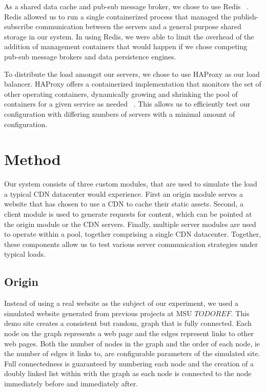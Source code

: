 \documentclass[conference]{IEEEtran}
\begin{document}
As a shared data cache and pub-sub message broker, we chose to use Redis ~\cite{redis}.  Redis allowed us to run a single containerized process that managed the publish-subscribe communication between the servers and a general purpose shared storage in our system. In using Redis, we were able to limit the overhead of the addition of management containers that would happen if we chose competing pub-sub message brokers and data persistence engines.

To distribute the load amongst our servers, we chose to use HAProxy as our load balancer.  HAProxy offers a containerized implementation that monitors the set of other operating containers, dynamically growing and shrinking the pool of containers for a given service as needed ~\cite{haproxy}.  This allows us to efficiently test our configuration with differing numbers of servers with a minimal amount of configuration.

\section{Method}\label{sec:method}
Our system consists of three custom modules, that are used to simulate the load a typical CDN datacenter would experience.  First an origin module serves a website that has chosen to use a CDN to cache their static assets.  Second, a client module is used to generate requests for content, which can be pointed at the origin module or the CDN servers.  Finally, multiple server modules are used to operate within a pool, together comprising a single CDN datacenter.  Together, these components allow us to test various server communication strategies under typical loads.
\subsection*{Origin}

Instead of using a real website as the subject of our experiment, we used a simulated website generated from previous projects at MSU $TODO REF$.  This demo site creates a consistent but random, graph that is fully connected.  Each node on the graph represents a web page and the edges represent links to other web pages.  Both the number of nodes in the graph and the order of each node, ie the number of edges it links to, are configurable parameters of the simulated site.  Full connectedness is guaranteed by numbering each node and the creation of a doubly linked list within with the graph as each node is connected to the node immediately before and immediately after.
\end{document}
